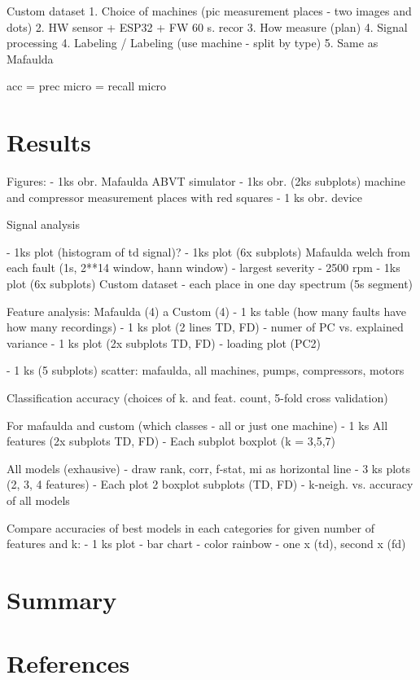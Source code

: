 \documentclass{llncs}
\begin{document}
Custom dataset
1. Choice of machines (pic measurement places - two images and dots)
2. HW sensor + ESP32 + FW 60 s. recor
3. How measure (plan)
4. Signal processing
4. Labeling  / Labeling (use machine - split by type) 
5. Same as Mafaulda

acc = prec micro = recall micro



\section{Results}


Figures:
- 1ks obr. Mafaulda ABVT simulator
- 1ks obr. (2ks subplots) machine and compressor measurement places with red squares
- 1 ks obr. device 


Signal analysis

- 1ks plot (histogram of td signal)?
- 1ks plot (6x subplots) Mafaulda welch from each fault (1s, 2**14 window, hann window)  - largest severity - 2500 rpm
- 1ks plot (6x subplots) Custom dataset - each place in one day spectrum (5s segment)

Feature analysis:
Mafaulda (4) a Custom (4) 
- 1 ks table (how many faults have how many recordings)
- 1 ks plot (2 lines TD, FD) - numer of PC vs. explained variance
- 1 ks plot (2x subplots TD, FD) - loading plot (PC2)

- 1 ks (5 subplots) scatter: mafaulda, all machines, pumps, compressors, motors


Classification accuracy (choices of k. and feat. count, 5-fold cross validation)

For mafaulda and custom (which classes - all or just one machine)
- 1 ks All features (2x subplots TD, FD)
	- Each subplot boxplot (k = 3,5,7)

All models (exhausive) - draw rank, corr, f-stat, mi as horizontal line
	- 3 ks plots (2, 3, 4 features)
		- Each plot 2 boxplot subplots (TD, FD) - k-neigh. vs. accuracy of all models


Compare accuracies of best models in each categories for given number of features and k:
- 1 ks plot - bar chart - color rainbow - one x (td), second x (fd)



\section{Summary}

\section{References}
\end{document}

